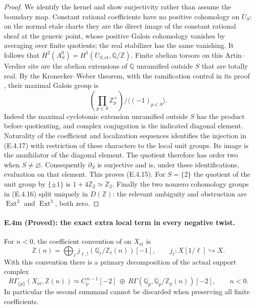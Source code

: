 \begin{proof}
We identify the kernel and show surjectivity rather than assume
the boundary map. Constant rational coefficients have no positive
cohomology on $\overline U_S$: on the normal etale charts they are
the direct image of the constant rational sheaf at the generic
point, whose positive Galois cohomology vanishes by averaging over
finite quotients; the real stabilizer has the same vanishing.
It follows that
$H^2(A_S^0)=H^1(\overline U_{S,\mathrm{et}},\mathbb Q/\mathbb Z)$.
Finite abelian torsors on this Artin--Verdier site are the abelian
extensions of $\mathbb Q$ unramified outside $S$ that are totally
real. By the Kronecker--Weber theorem, with the ramification
control in its proof
\citep[I, Theorem 4.16 and Lemma 4.17, pp.~49--50]{D_MilneCFT2020},
their maximal Galois group is
\[
 \left(\prod_{p\in S}\mathbb Z_p^\times\right)/
                      \langle(-1)_{p\in S}\rangle.
\]
Indeed the maximal cyclotomic extension unramified outside $S$
has the product before quotienting, and complex conjugation is
the indicated diagonal element. Naturality of the coefficient
and localization sequences identifies the injection in (E.4.17)
with restriction of these characters to the local unit groups.
Its image is the annihilator of the diagonal element. The
quotient therefore has order two when $S\ne\varnothing$.
Consequently $\partial_S$ is surjective and is, under these
identifications, evaluation on that element. This proves
(E.4.15). For $S=\{2\}$ the quotient of the unit group by
$\{\pm1\}$ is $1+4\mathbb Z_2\simeq\mathbb Z_2$.
Finally the two nonzero cohomology groups in (E.4.16) split
uniquely in $D(\mathbb Z)$: the relevant ambiguity and obstruction
are $\operatorname{Ext}^2$ and $\operatorname{Ext}^3$, both zero.
\end{proof}

\paragraph{E.4m (Proved): the exact extra local term in every negative twist.}
For $n<0$, the coefficient convention of
\citet[\S3.1 and \S6.2]{D_FlachMorin2018} on $X_{\mathrm{et}}$ is
\[
 \mathbb Z(n)=
   \bigoplus_\ell j_{\ell,!}(\mathbb Q_\ell/\mathbb Z_\ell(n))[-1],
 \qquad j_\ell:X[1/\ell]\hookrightarrow X.
 \tag{E.4.18}
\]
With this convention there is a primary decomposition of the
actual support complex
\[
 R\Gamma_{\{p\}}(X_{\mathrm{et}},\mathbb Z(n))
 \simeq
 C_p^{\,n-1}[-2]\ \oplus\
 R\Gamma(\mathbb Q_p,\mathbb Q_p/\mathbb Z_p(n))[-2],
 \qquad n<0.
 \tag{E.4.19}
\]
In particular the second summand cannot be discarded when
preserving all finite coefficients.

